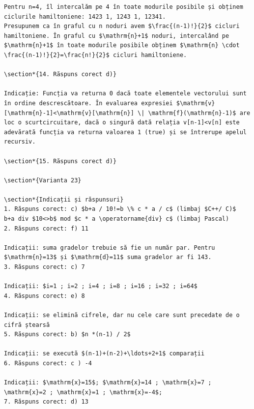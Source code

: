 \documentclass[10pt]{article}
\begin{document}
\begin{verbatim}
Pentru n=4, îl intercalăm pe 4 în toate modurile posibile și obținem ciclurile hamiltoniene: 1423 1, 1243 1, 12341.
Presupunem ca în graful cu n noduri avem $\frac{(n-1)!}{2}$ cicluri hamiltoniene. În graful cu $\mathrm{n}+1$ noduri, intercalând pe $\mathrm{n}+1$ în toate modurile posibile obținem $\mathrm{n} \cdot \frac{(n-1)!}{2}=\frac{n!}{2}$ cicluri hamiltoniene.

\section*{14. Răspuns corect d)}

Indicație: Funcția va returna 0 dacă toate elementele vectorului sunt în ordine descrescătoare. În evaluarea expresiei $\mathrm{v}[\mathrm{n}-1]<\mathrm{v}[\mathrm{n}] \| \mathrm{f}(\mathrm{n}-1)$ are loc o scurtcircuitare, dacă o singură dată relația v[n-1]<v[n] este adevărată funcția va returna valoarea 1 (true) și se întrerupe apelul recursiv.

\section*{15. Răspuns corect d)}

\section*{Varianta 23}

\section*{Indicații și răspunsuri}
1. Răspuns corect: c) $b+a / 10!=b \% c * a / c$ (limbaj $C++/ C)$
b+a div $10<>b$ mod $c * a \operatorname{div} c$ (limbaj Pascal)
2. Răspuns corect: f) 11

Indicații: suma gradelor trebuie să fie un număr par. Pentru $\mathrm{n}=13$ și $\mathrm{d}=11$ suma gradelor ar fi 143.
3. Răspuns corect: c) 7

Indicații: $i=1 ; i=2 ; i=4 ; i=8 ; i=16 ; i=32 ; i=64$
4. Răspuns corect: e) 8

Indicații: se elimină cifrele, dar nu cele care sunt precedate de o cifră ștearsă
5. Răspuns corect: b) $n *(n-1) / 2$

Indicații: se execută $(n-1)+(n-2)+\ldots+2+1$ comparații
6. Răspuns corect: c ) -4

Indicații: $\mathrm{x}=15$; $\mathrm{x}=14 ; \mathrm{x}=7 ; \mathrm{x}=2 ; \mathrm{x}=1 ; \mathrm{x}=-4$;
7. Răspuns corect: d) 13


\end{verbatim}
\end{document}
